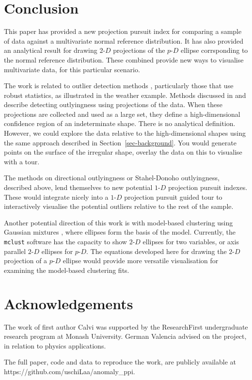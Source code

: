 \documentclass[
  12pt]{article}
\newcommand\pD{$p\text{-}D$}
\newcommand\gD{$2\text{-}D$}
\newcommand\bD{$1\text{-}D$}
\begin{document}
\section{Conclusion}\label{conclusion}

This paper has provided a new projection pursuit index for comparing a
sample of data against a multivariate normal reference distribution. It
has also provided an analytical result for drawing \gD{} projections of
the \pD{} ellipse corrsponding to the normal reference distribution.
These combined provide new ways to visualise multivariate data, for this
particular scenario.

The work is related to outlier detection methods \citep[see,][for
example]{filzmoser2018}, particularly those that use robust statistics,
as illustrated in the weather example. Methods discussed in
\citet{directional-outlyingness} and \citet{donoho1982} describe
detecting outlyingness using projections of the data. When these
projections are collected and used as a large set, they define a
high-dimensional confidence region of an indeterminate shape. There is
no analytical definition. However, we could explore the data relative to
the high-dimensional shapes using the same approach described in
Section~\ref{sec-background}. You would generate points on the surface
of the irregular shape, overlay the data on this to visualise with a
tour.

The methods on directional outlyingness or Stahel-Donoho outlyingness,
described above, lend themselves to new potential \bD{} projection
pursuit indexes. These would integrate nicely into a \bD{} projection
pursuit guided tour to interactively visualise the potential outliers
relative to the rest of the sample.

Another potential direction of this work is with model-based clustering
using Gaussian mixtures \citep{FR02}, where ellipses form the basis of
the model. Currently, the \texttt{mclust} software \citep{mclust} has
the capacity to show \gD{} ellipses for two variables, or axis parallel
\gD{} ellipses for \pD{}. The equations developed here for drawing the
\gD{} projection of a \pD{} ellipse would provide more versatile
visualisation for examining the model-based clustering fits.

\section*{Acknowledgements}\label{acknowledgements}

The work of first author Calvi was supported by the ResearchFirst
undergraduate research program at Monash University. German Valencia
advised on the project, in relation to physics applications.

The full paper, code and data to reproduce the work, are publicly
available at https://github.com/uschiLaa/anomaly\_ppi.


  
\end{document}
